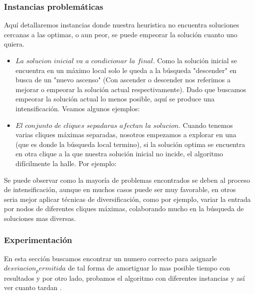 \subsubsection{Instancias problemáticas}

 Aquí detallaremos instancias donde nuestra heuristica no encuentra soluciones cercanas a las optimas, o aun peor, se puede empeorar la solución cuanto uno quiera.

\begin{itemize}
 
  \item $La$ $solucion$ $inicial$ $va$ $a$ $condicionar$ $la$ $final$. Como la solución inicial se encuentra en un máximo local solo le queda a la búsqueda "descender" en busca de un "nuevo ascenso" (Con ascender o descender nos referimos a mejorar o empeorar la solución actual respectivamente). Dado que buscamos empeorar la solución actual lo menos posible, aquí se produce una intensificación. Veamos algunos ejemplos:

  \item $El$ $conjunto$ $de$ $cliques$ $sepadaras$ $afectan$ $la$ $solucion$. Cuando tenemos varias cliques máximas separadas, nosotros empezamos a explorar en una (que es donde la búsqueda local termino), si la solución optima se encuentra en otra clique a la que nuestra solución inicial no incide, el algoritmo difícilmente la halle. Por ejemplo:

\end{itemize}

Se puede observar como la mayoría de problemas encontrados se deben al proceso de intensificación, aunque en muchos casos puede ser muy favorable, en otros seria mejor aplicar técnicas de diversificación, como por ejemplo, variar la entrada por nodos de diferentes cliques máximas, colaborando mucho en la búsqueda de soluciones mas diversas.

\subsubsection{Experimentación}

 En esta sección buscamos encontrar un numero correcto para asignarle $desviacion_permitida$ de tal forma de amortiguar lo mas posible tiempo con resultados y por otro lado, probamos el algoritmo con diferentes instancias y así ver cuanto tardan .
